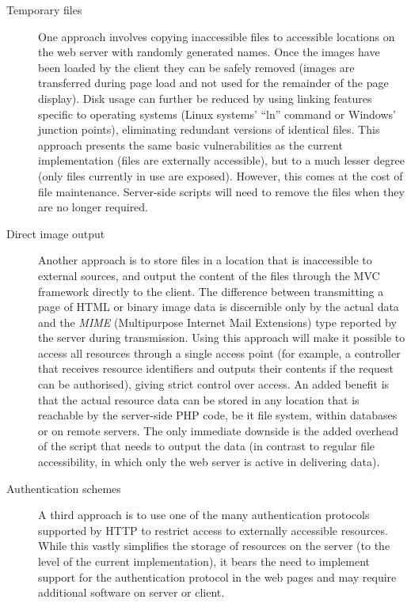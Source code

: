 \begin{description}
    \item[Temporary files] One approach involves copying inaccessible files to accessible locations on the web server with randomly generated names. Once the images have been loaded by the client they can be safely removed (images are transferred during page load and not used for the remainder of the page display). Disk usage can further be reduced by using linking features specific to operating systems (Linux systems' ``ln'' command or Windows' junction points), eliminating redundant versions of identical files. This approach presents the same basic vulnerabilities as the current implementation (files are externally accessible), but to a much lesser degree (only files currently in use are exposed). However, this comes at the cost of file maintenance. Server-side scripts will need to remove the files when they are no longer required.
    \item[Direct image output] Another approach is to store files in a location that is inaccessible to external sources, and output the content of the files through the MVC framework directly to the client. The difference between transmitting a page of HTML or binary image data is discernible only by the actual data and the \emph{MIME} (Multipurpose Internet Mail Extensions)\cite{MIME} type reported by the server during transmission. Using this approach will make it possible to access all resources through a single access point (for example, a controller that receives resource identifiers and outputs their contents if the request can be authorised), giving strict control over access. An added benefit is that the actual resource data can be stored in any location that is reachable by the server-side PHP code, be it file system, within databases or on remote servers. The only immediate downside is the added overhead of the script that needs to output the data (in contrast to regular file accessibility, in which only the web server is active in delivering data).
    \item[Authentication schemes] A third approach is to use one of the many authentication protocols supported by HTTP to restrict access to externally accessible resources. While this vastly simplifies the storage of resources on the server (to the level of the current implementation), it bears the need to implement support for the authentication protocol in the web pages and may require additional software on server or client.
\end{description}

